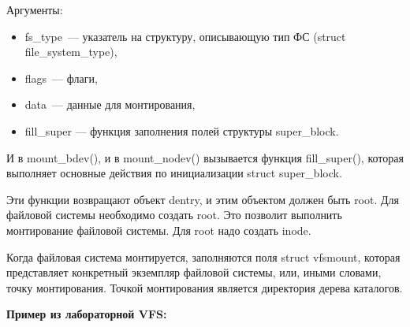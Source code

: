 Аргументы:
\begin{itemize}
    \item fs\_type — указатель на структуру, описывающую тип ФС (struct \\ file\_system\_type),
    \item flags — флаги,
    \item data — данные для монтирования,
    \item fill\_super --- функция заполнения полей структуры super\_block.
\end{itemize}

И в mount\_bdev(), и в mount\_nodev() вызывается функция fill\_super(), которая выполняет основные действия по инициализации struct super\_block.

Эти функции возвращают объект dentry, и этим объектом должен быть root. Для файловой системы необходимо создать root. Это позволит выполнить монтирование файловой системы. Для root надо создать inode.

Когда файловая система монтируется, заполняются поля struct vfsmount, которая представляет конкретный экземпляр файловой системы, или, иными словами, точку монтирования. Точкой монтирования является директория дерева каталогов.

\textbf{Пример из лабораторной VFS:}

